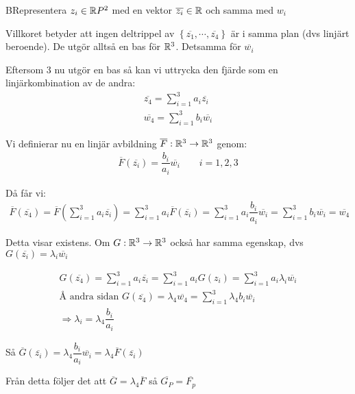 \begin{prf}
  BRepresentera $z_i\in\mathbb{R} P^2$ med en vektor $\overline{z_i}\in\mathbb{R}$ och samma med $w_i$
  \par\bigskip
  \noindent Villkoret betyder att ingen deltrippel av $\left\{\overline{z_1},\cdots,\overline{z_4}\right\}$ är i samma plan (dvs linjärt beroende). De utgör alltså en bas för $\mathbb{R}^3$. Detsamma för $\overline{w_i}$
  \par\bigskip
  \noindent Eftersom 3 nu utgör en bas så kan vi uttrycka den fjärde som en linjärkombination av de andra:
  \begin{equation*}
    \begin{gathered}
      \overline{z_4} = \sum_{i=1}^{3}a_i\overline{z_i}\\
      \overline{w_4} = \sum_{i=1}^{3}b_i\overline{w_i}
    \end{gathered}
  \end{equation*}
  \par\bigskip
  \noindent Vi definierar nu en linjär avbildning $\overline{F}:\mathbb{R}^3\to\mathbb{R}^3$ genom:
  \begin{equation*}
    \begin{gathered}
      \overline{F}(\overline{z_i}) = \dfrac{b_i}{a_i}\overline{w_i}\qquad i=1,2,3
    \end{gathered}
  \end{equation*}
  \par\bigskip
  \noindent Då får vi:
  \begin{equation*}
    \begin{gathered}
      \overline{F}(\overline{z_4}) = \overline{F}\left(\sum_{i=1}^{3}a_i\overline{z_i}\right) = \sum_{i=1}^{3}a_i\overline{F}(\overline{z_i}) = \sum_{i=1}^{3}a_i\dfrac{b_i}{a_i}\overline{w_i} = \sum_{i=1}^{3}b_i\overline{w_i} = \overline{w_4}
    \end{gathered}
  \end{equation*}
  \par\bigskip
  \noindent Detta visar existens. Om $G:\mathbb{R}^3\to\mathbb{R}^3$ också har samma egenskap, dvs $G(\overline{z_i})=\lambda_i\overline{w_i}$\par
  \begin{equation*}
    \begin{gathered}
      G(\overline{z_4}) = \sum_{i=1}^{3}a_i\overline{z_i} = \sum_{i=1}^{3}a_iG(z_i) = \sum_{i=1}^{3}a_i\lambda_i\overline{w_i}\\
      \text{Å andra sidan } G(\overline{z_4}) = \lambda_4\overline{w_4} = \sum_{i=1}^{3}\lambda_4b_i\overline{w_i}\\
      \Rightarrow \lambda_i = \lambda_4\dfrac{b_i}{a_i}
    \end{gathered}
  \end{equation*}
  \par\bigskip
  \noindent Så $\overline{G}(\overline{z_i}) = \lambda_4\dfrac{b_i}{a_i}\overline{w_i} = \lambda_4\overline{F}(\overline{z_i})$\par
  \noindent Från detta följer det att $\overline{G} = \lambda_4\overline{F}$ så $\overline{G_P} = \overline{F_p}$
\end{prf}
\newpage
